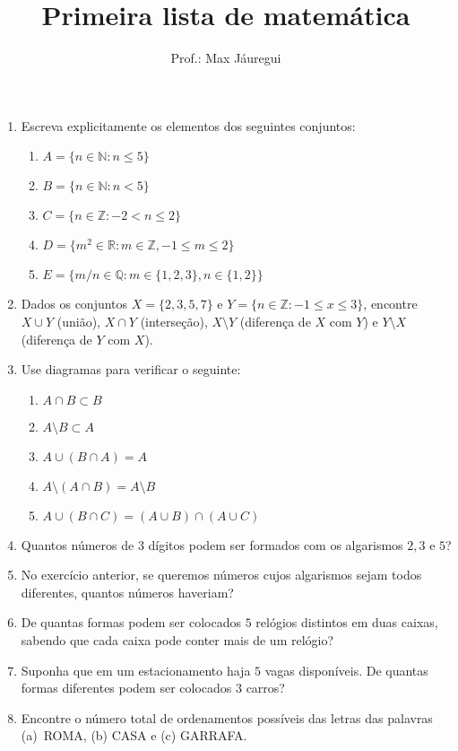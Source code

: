 \documentclass[12pt,a4paper]{article}
\title{Primeira lista de matemática}
\author{Prof.: Max Jáuregui}
\date{}
\newcommand{\N}{\mathbb{N}}
\newcommand{\Z}{\mathbb{Z}}
\newcommand{\Q}{\mathbb{Q}}
\newcommand{\R}{\mathbb{R}}
\begin{document}
\maketitle
\begin{enumerate}
  \item Escreva explicitamente os elementos dos seguintes conjuntos:
  \begin{enumerate}
    \item $A=\{n\in\N:n\le 5\}$
    \item $B=\{n\in\N:n<5\}$
    \item $C=\{n\in\Z:-2<n\le 2\}$
    \item $D=\{m^2\in\R:m\in\Z, -1\le m\le 2\}$
    \item $E=\{m/n\in\Q:m\in\{1,2,3\},n\in\{1,2\}\}$
  \end{enumerate}
  \item Dados os conjuntos $X=\{2,3,5,7\}$ e $Y=\{n\in\Z:-1\le x\le 3\}$, encontre $X\cup Y$ (união), $X\cap Y$ (interseção), $X\setminus Y$ (diferença de $X$ com $Y$) e $Y\setminus X$ (diferença de $Y$ com $X$).
  \item Use diagramas para verificar o seguinte:
  \begin{enumerate}
    \item $A\cap B\subset B$
    \item $A\setminus B\subset A$
    \item $A\cup(B\cap A)=A$
    \item $A\setminus(A\cap B)=A\setminus B$
    \item $A\cup(B\cap C)=(A\cup B)\cap (A\cup C)$
  \end{enumerate}
  \item Quantos números de $3$ dígitos podem ser formados com os algarismos $2,3$ e $5$?
  \item No exercício anterior, se queremos números cujos algarismos sejam todos diferentes, quantos números haveriam?
  \item De quantas formas podem ser colocados $5$ relógios distintos em duas caixas, sabendo que cada caixa pode conter mais de um relógio?
  \item Suponha que em um estacionamento haja $5$ vagas disponíveis. De quantas formas diferentes podem ser colocados $3$ carros?
  \item Encontre o número total de ordenamentos possíveis das letras das palavras (a)~ROMA, (b) CASA e (c) GARRAFA.
\end{enumerate}
\end{document}
